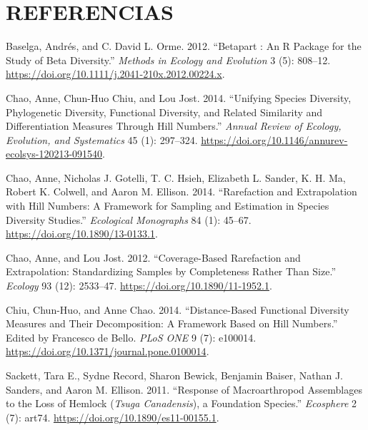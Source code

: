 \documentclass[
]{article}
\newlength{\cslhangindent}
\newlength{\cslentryspacingunit} %
\newenvironment{CSLReferences}[2] %
 {%
  \setlength{\parindent}{0pt}
  \ifodd #1
  \let\oldpar\par
  \def\par{\hangindent=\cslhangindent\oldpar}
  \fi
  \setlength{\parskip}{#2\cslentryspacingunit}
 }%
 {}
\begin{document}
\newpage

\hypertarget{referencias}{%
\section{REFERENCIAS}\label{referencias}}

\hfill\break

\hypertarget{refs}{}
\begin{CSLReferences}{1}{0}
\leavevmode{}%
Baselga, Andrés, and C. David L. Orme. 2012. {``Betapart : An R Package
for the Study of Beta Diversity.''} \emph{Methods in Ecology and
Evolution} 3 (5): 808--12.
\url{https://doi.org/10.1111/j.2041-210x.2012.00224.x}.

\leavevmode{}%
Chao, Anne, Chun-Huo Chiu, and Lou Jost. 2014. {``Unifying Species
Diversity, Phylogenetic Diversity, Functional Diversity, and Related
Similarity and Differentiation Measures Through Hill Numbers.''}
\emph{Annual Review of Ecology, Evolution, and Systematics} 45 (1):
297--324. \url{https://doi.org/10.1146/annurev-ecolsys-120213-091540}.

\leavevmode{}%
Chao, Anne, Nicholas J. Gotelli, T. C. Hsieh, Elizabeth L. Sander, K. H.
Ma, Robert K. Colwell, and Aaron M. Ellison. 2014. {``Rarefaction and
Extrapolation with Hill Numbers: A Framework for Sampling and Estimation
in Species Diversity Studies.''} \emph{Ecological Monographs} 84 (1):
45--67. \url{https://doi.org/10.1890/13-0133.1}.

\leavevmode{}%
Chao, Anne, and Lou Jost. 2012. {``Coverage-Based Rarefaction and
Extrapolation: Standardizing Samples by Completeness Rather Than
Size.''} \emph{Ecology} 93 (12): 2533--47.
\url{https://doi.org/10.1890/11-1952.1}.

\leavevmode{}%
Chiu, Chun-Huo, and Anne Chao. 2014. {``Distance-Based Functional
Diversity Measures and Their Decomposition: A Framework Based on Hill
Numbers.''} Edited by Francesco de Bello. \emph{PLoS ONE} 9 (7):
e100014. \url{https://doi.org/10.1371/journal.pone.0100014}.

\leavevmode{}%
Sackett, Tara E., Sydne Record, Sharon Bewick, Benjamin Baiser, Nathan
J. Sanders, and Aaron M. Ellison. 2011. {``Response of Macroarthropod
Assemblages to the Loss of Hemlock ({\emph{Tsuga Canadensis}}), a
Foundation Species.''} \emph{Ecosphere} 2 (7): art74.
\url{https://doi.org/10.1890/es11-00155.1}.

\end{CSLReferences}
\end{document}
